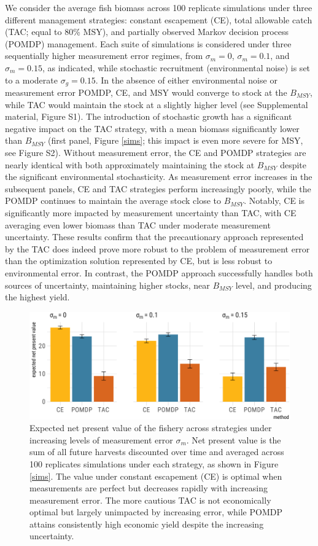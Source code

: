 \documentclass[3p]{elsarticle} %
\makeatletter
\def\maxwidth{\ifdim\Gin@nat@width>\linewidth\linewidth
\else\Gin@nat@width\fi}
\let\Oldincludegraphics\includegraphics
\renewcommand{\includegraphics}[1]{\Oldincludegraphics[width=\maxwidth]{#1}}
\makeatother
\begin{document}
We consider the average fish biomass across 100 replicate simulations
under three different management strategies: constant escapement (CE),
total allowable catch (TAC; equal to 80\% MSY), and partially observed
Markov decision process (POMDP) management. Each suite of simulations is
considered under three sequentially higher measurement error regimes,
from \(\sigma_m = 0\), \(\sigma_m = 0.1\), and \(\sigma_m = 0.15\), as
indicated, while stochastic recruitment (environmental noise) is set to
a moderate \(\sigma_g = 0.15\). In the absence of either environmental
noise or measurement error POMDP, CE, and MSY would converge to stock at
the \(B_{MSY}\), while TAC would maintain the stock at a slightly higher
level (see Supplemental material, Figure S1). The introduction of
stochastic growth has a significant negative impact on the TAC strategy,
with a mean biomass significantly lower than \(B_{MSY}\) (first panel,
Figure \ref{sims}; this impact is even more severe for MSY, see Figure
S2). Without measurement error, the CE and POMDP strategies are nearly
identical with both approximately maintaining the stock at \(B_{MSY}\)
despite the significant environmental stochasticity. As measurement
error increases in the subsequent panels, CE and TAC strategies perform
increasingly poorly, while the POMDP continues to maintain the average
stock close to \(B_{MSY}\). Notably, CE is significantly more impacted
by measurement uncertainty than TAC, with CE averaging even lower
biomass than TAC under moderate measurement uncertainty. These results
confirm that the precautionary approach represented by the TAC does
indeed prove more robust to the problem of measurement error than the
optimization solution represented by CE, but is less robust to
environmental error. In contrast, the POMDP approach successfully
handles both sources of uncertainty, maintaining higher stocks, near
\(B_{MSY}\) level, and producing the highest yield.

\begin{figure}
\centering
\includegraphics{manuscript_files/figure-latex/econ-1.pdf}
\caption{Expected net present value of the fishery across strategies
under increasing levels of measurement error \(\sigma_m\). Net present
value is the sum of all future harvests discounted over time and
averaged across 100 replicates simulations under each strategy, as shown
in Figure \ref{sims}. The value under constant escapement (CE) is
optimal when measurements are perfect but decreases rapidly with
increasing measurement error. The more cautious TAC is not economically
optimal but largely unimpacted by increasing error, while POMDP attains
consistently high economic yield despite the increasing uncertainty.
\label{econ}}
\end{figure}
\end{document}

